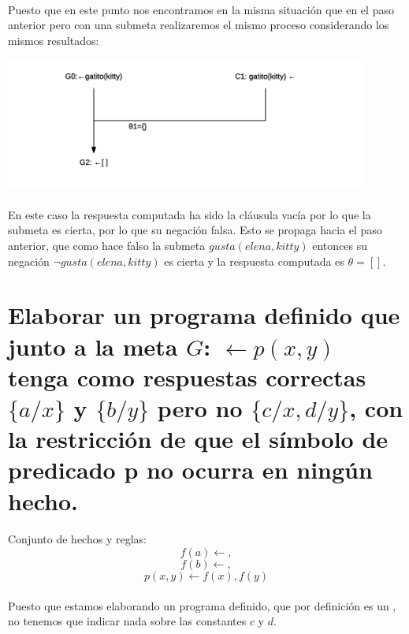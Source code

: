 \documentclass[11pt, a4paper,spanish]{article}
\begin{document}
		\paragraph{}
		Puesto que en este punto nos encontramos en la misma situación que en el paso anterior pero con una submeta realizaremos el mismo proceso considerando los mismos resultados:

		\includegraphics[width=0.9\textwidth]{sldnf-computation-2}

		\paragraph{}
		En este caso la respuesta computada ha sido la cláusula vacía por lo que la submeta es cierta, por lo que su negación falsa. Esto se propaga hacia el paso anterior, que como hace falso la submeta $gusta(elena,kitty)$ entonces su negación $ \neg gusta(elena,kitty)$ es cierta y la respuesta computada es $\theta = [ ]$.

	\section{Elaborar un programa definido que junto a la meta $G$: $\gets p(x,y)$ tenga como respuestas correctas $\{ a / x \}$ y $\{b / y\}$ pero no $\{c / x, d / y\}$, con la restricción de que el símbolo de predicado p no ocurra en ningún hecho.}

		\paragraph{}
		Conjunto de hechos y reglas:
		\[ f(a) \gets, \]
		\[ f(b) \gets, \]
		\[ p(x,y) \gets f(x), f(y) \]

		\paragraph{}
		Puesto que estamos elaborando un programa definido, que por definición es un  , no tenemos que indicar nada sobre las constantes $c$ y $d$.
\end{document}
